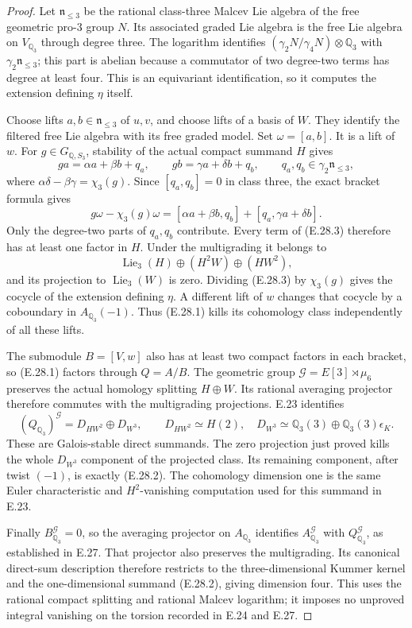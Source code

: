 \begin{proof}
Let $\mathfrak n_{\leq3}$ be the rational class-three
Malcev Lie algebra of the free geometric pro-$3$ group
$N$. Its associated graded Lie algebra is the free Lie
algebra on $V_{\mathbb Q_3}$ through degree three.
The logarithm identifies
$(\gamma_2N/\gamma_4N)\otimes\mathbb Q_3$
with $\gamma_2\mathfrak n_{\leq3}$; this part is
abelian because a commutator of two degree-two terms
has degree at least four. This is an equivariant
identification, so it computes the extension defining
$\eta$ itself.

Choose lifts $a,b\in\mathfrak n_{\leq3}$ of $u,v$,
and choose lifts of a basis of $W$. They identify the
filtered free Lie algebra with its free graded model.
Set $\omega=[a,b]$. It is a lift of $w$. For
$g\in G_{\mathbb Q,S_3}$, stability of the actual
compact summand $H$ gives
\[
 ga=\alpha a+\beta b+q_a,
 \qquad gb=\gamma a+\delta b+q_b,
 \qquad q_a,q_b\in\gamma_2\mathfrak n_{\leq3},
\]
where $\alpha\delta-\beta\gamma=\chi_3(g)$.
Since $[q_a,q_b]=0$ in class three, the exact bracket
formula gives
\[
 g\omega-\chi_3(g)\omega
   =[\alpha a+\beta b,q_b]
       +[q_a,\gamma a+\delta b].
 \tag{E.28.3}
\]
Only the degree-two parts of $q_a,q_b$ contribute.
Every term of (E.28.3) therefore has at least one
factor in $H$. Under the multigrading it belongs to
\[
 \operatorname{Lie}_3(H)\oplus(H^2W)\oplus(HW^2),
\]
and its projection to $\operatorname{Lie}_3(W)$ is
zero. Dividing (E.28.3) by $\chi_3(g)$ gives the
cocycle of the extension defining $\eta$. A different
lift of $w$ changes that cocycle by a coboundary in
$A_{\mathbb Q_3}(-1)$. Thus (E.28.1) kills its
cohomology class independently of all these lifts.

The submodule $B=[V,w]$ also has at least two compact
factors in each bracket, so (E.28.1) factors through
$Q=A/B$. The geometric group
$\mathcal G=E[3]\rtimes\mu_6$ preserves the actual
homology splitting $H\oplus W$. Its rational
averaging projector therefore commutes with the
multigrading projections. E.23 identifies
\[
 (Q_{\mathbb Q_3})^{\mathcal G}
       =D_{HW^2}\oplus D_{W^3},
 \qquad
 D_{HW^2}\simeq H(2),
 \quad
 D_{W^3}\simeq\mathbb Q_3(3)
                     \oplus\mathbb Q_3(3)\epsilon_K.
\]
These are Galois-stable direct summands. The zero
projection just proved kills the whole $D_{W^3}$
component of the projected class. Its remaining
component, after twist $(-1)$, is exactly (E.28.2).
The cohomology dimension one is the same Euler
characteristic and $H^2$-vanishing computation used
for this summand in E.23.

Finally $B^{\mathcal G}_{\mathbb Q_3}=0$, so the
averaging projector on $A_{\mathbb Q_3}$ identifies
$A^{\mathcal G}_{\mathbb Q_3}$ with
$Q^{\mathcal G}_{\mathbb Q_3}$, as established in
E.27. That projector also preserves the multigrading.
Its canonical direct-sum description therefore
restricts to the three-dimensional Kummer kernel
and the one-dimensional summand (E.28.2), giving
dimension four. This uses the rational compact
splitting and rational Malcev logarithm; it imposes
no unproved integral vanishing on the torsion
recorded in E.24 and E.27.
\end{proof}
